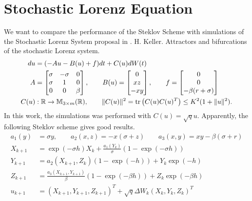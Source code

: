 \documentclass[review]{elsarticle}
\begin{document}
	\section{Stochastic Lorenz Equation}
		We want to compare the performance of the Steklov Scheme with simulations of the Stochastic
		Lorenz System proposal in \cite{Keller1996}.
		H. Keller. Attractors and bifurcations of the stochastic Lorenz system.
		\begin{align*}
			du &= (-Au - B(u) + f)dt +C(u)dW(t)\\
			A & = 
			\begin{bmatrix}
				\sigma	&-\sigma	&0\\
				\sigma	&1			&0\\
				0		&0			&\beta
			\end{bmatrix}, 
			\qquad
			B(u) = 
			\begin{bmatrix}
				0\\
				xz\\
				-xy
			\end{bmatrix},
			\qquad
			f=
			\begin{bmatrix}
				0\\
				0\\
				-\beta(r+\sigma)
			\end{bmatrix}\\
			C(u) &: \mathbb{R} \to \mathbb{M}_{3 \times m}(\mathbb{R}), \qquad
			\|C(u)\|^2 = \operatorname{tr}\left(C(u)C(u)^T\right)\leq K^2(1+ \|u\|^2).
		\end{align*}
		In this work, the simulations was performed with $C(u)=\sqrt{q}u$.
		Apparently, the following Steklov scheme gives good results.
		\begin{align*}
			a_1(y) &= \sigma y, \qquad a_2(x,z) = -x (\sigma +z) \qquad 
			a_3(x,y) = x y -\beta(\sigma +r)	\\
			X_{k+1} &= \exp(-\sigma h) X_{k} 
				+\frac{a_1(Y_k)}{\sigma}
				(1-\exp(-\sigma h))				\\
			Y_{k+1} &= a_2(X_{k+1},Z_{k}) (1-\exp(-h))
				+Y_k \exp(-h)\\
			Z_{k+1} &= \frac{a_3(X_{k+1}, Y_{k+1})}{\beta} (1- \exp(-\beta h))
				+Z_{k} \exp(-\beta h)			\\
			u_{k+1} &= (X_{k+1},Y_{k+1},Z_{k+1})^T + \sqrt{q} \Delta W_k (X_{k},Y_{k},Z_{k})^T
		\end{align*}
\end{document}
